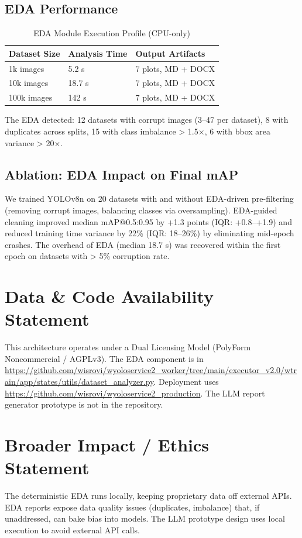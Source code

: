 \documentclass[10pt,twocolumn,letterpaper]{article}
\begin{document}
\subsection{EDA Performance}
\begin{table}[htbp]
\centering
\caption{EDA Module Execution Profile (CPU-only)}
\label{tab:eda_perf}
\begin{tabular}{@{}lll@{}}
\toprule
Dataset Size & Analysis Time & Output Artifacts \\ \midrule
1k images & 5.2 s & 7 plots, MD + DOCX \\
10k images & 18.7 s & 7 plots, MD + DOCX \\
100k images & 142 s & 7 plots, MD + DOCX \\ \bottomrule
\end{tabular}
\end{table}

The EDA detected: 12 datasets with corrupt images (3--47 per dataset), 8 with duplicates across splits, 15 with class imbalance > 1.5$\times$, 6 with bbox area variance > 20$\times$.

\subsection{Ablation: EDA Impact on Final mAP}
We trained YOLOv8n on 20 datasets with and without EDA-driven pre-filtering (removing corrupt images, balancing classes via oversampling). EDA-guided cleaning improved median mAP@0.5:0.95 by +1.3 points (IQR: +0.8--+1.9) and reduced training time variance by 22\% (IQR: 18--26\%) by eliminating mid-epoch crashes. The overhead of EDA (median 18.7 s) was recovered within the first epoch on datasets with > 5\% corruption rate.

\section{Data \& Code Availability Statement}
This architecture operates under a Dual Licensing Model (PolyForm Noncommercial / AGPLv3). The EDA component is in \url{https://github.com/wisrovi/wyoloservice2_worker/tree/main/executor_v2.0/wtrain/app/states/utils/dataset_analyzer.py}. Deployment uses \url{https://github.com/wisrovi/wyoloservice2_production}. The LLM report generator prototype is not in the repository.

\section{Broader Impact / Ethics Statement}
The deterministic EDA runs locally, keeping proprietary data off external APIs. EDA reports expose data quality issues (duplicates, imbalance) that, if unaddressed, can bake bias into models. The LLM prototype design uses local execution to avoid external API calls.
\end{document}
